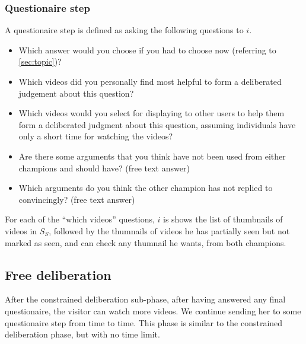 \documentclass[version=3.21, pagesize, twoside=off, bibliography=totoc, DIV=calc, fontsize=12pt, a4paper]{scrartcl}
\begin{document}
\subsubsection{Questionaire step}
A questionaire step is defined as asking the following questions to $i$. 
\begin{itemize}
	\item Which answer would you choose if you had to choose now (referring to \cref{sec:topic})?
	\item Which videos did you personally find most helpful to form a deliberated judgement about this question?
	\item Which videos would you select for displaying to other users to help them form a deliberated judgment about this question, assuming individuals have only a short time for watching the videos?
	\item Are there some arguments that you think have not been used from either champions and should have? (free text answer)
	\item Which arguments do you think the other champion has not replied to convincingly? (free text answer) 
\end{itemize}
For each of the “which videos” questions, $i$ is shows the list of thumbnails of videos in $S_S$, followed by the thumnails of videos he has partially seen but not marked as seen, and can check any thumnail he wants, from both champions. 

\subsection{Free deliberation}
After the constrained deliberation sub-phase, after having answered any final questionaire, the visitor can watch more videos. We continue sending her to some questionaire step from time to time. This phase is similar to the constrained deliberation phase, but with no time limit.
\end{document}
